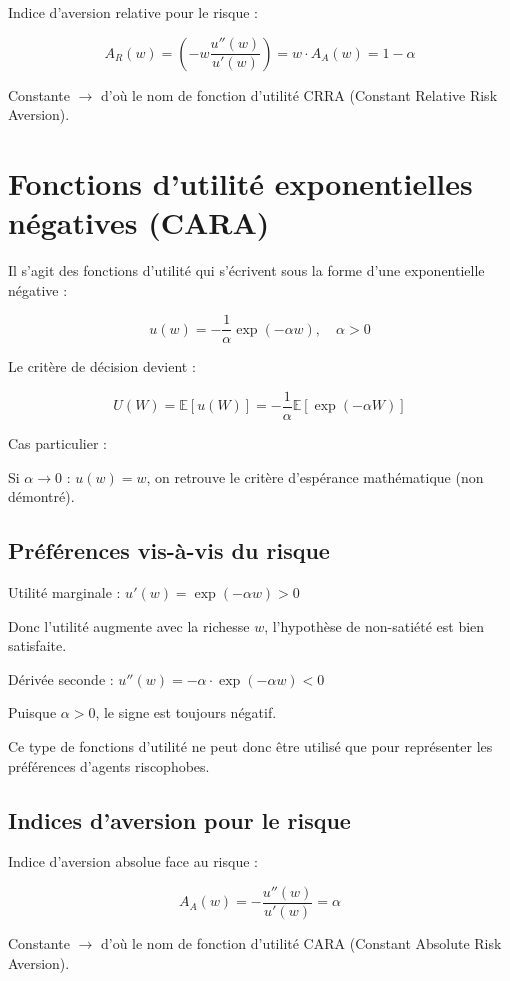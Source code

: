 \documentclass[a4paper, 12pt]{report}
\begin{document}
Indice d'aversion relative pour le risque :

\[
A_R(w) = \left( -w \frac{u''(w)}{u'(w)} \right) = w \cdot A_A(w) = 1 - \alpha
\]

Constante \(\rightarrow\) d'où le nom de fonction d'utilité CRRA (Constant Relative Risk Aversion).

\section{Fonctions d'utilité exponentielles négatives (CARA)}

Il s'agit des fonctions d'utilité qui s'écrivent sous la forme d'une exponentielle négative :

\[
u(w) = -\frac{1}{\alpha} \exp(-\alpha w), \quad \alpha > 0
\]

Le critère de décision devient :

\[
U(W) = \mathbb{E}\left[ u(W)\right]  = -\frac{1}{\alpha} \mathbb{E}\left[ \exp(-\alpha W)\right] 
\]

Cas particulier :

Si \( \alpha \to 0 \) : \( u(w) = w \), on retrouve le critère d'espérance mathématique (non démontré).

\subsection{Préférences vis-à-vis du risque}

Utilité marginale : \( u'(w) = \exp(-\alpha w) > 0 \)

Donc l'utilité augmente avec la richesse \( w \), l'hypothèse de non-satiété est bien satisfaite.

Dérivée seconde : \( u''(w) = -\alpha \cdot \exp(-\alpha w) < 0 \)

Puisque \( \alpha > 0 \), le signe est toujours négatif.

Ce type de fonctions d'utilité ne peut donc être utilisé que pour représenter les préférences d'agents riscophobes.

\subsection{Indices d'aversion pour le risque}

Indice d'aversion absolue face au risque :

\[
A_A(w) = - \frac{u''(w)}{u'(w)} = \alpha
\]

Constante \(\rightarrow\) d'où le nom de fonction d'utilité CARA (Constant Absolute Risk Aversion).
\end{document}
